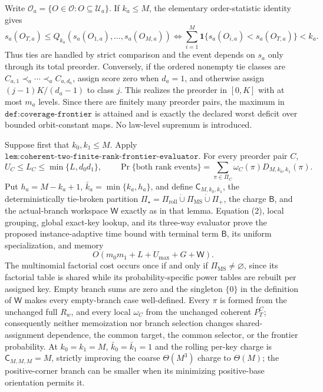 Write \(\mathcal O_a=\{O\in\mathcal O:O\subseteq\mathcal U_a\}\). If \(k_a\le M\), the elementary order-statistic identity gives
\[s_a(O_{T,a})\le Q_{k_a}(s_a(O_{1,a}),\ldots,s_a(O_{M,a}))\iff\sum_{i=1}^M\mathbf 1\{s_a(O_{i,a})<s_a(O_{T,a})\}<k_a.\tag{1}\]
Thus ties are handled by strict comparison and the event depends on \(s_a\) only through its total preorder. Conversely, if the ordered nonempty tie classes are \(C_{a,1}\prec_a\cdots\prec_a C_{a,d_a}\), assign score zero when \(d_a=1\), and otherwise assign \((j-1)K/(d_a-1)\) to class \(j\). This realizes the preorder in \([0,K]\) with at most \(m_a\) levels. Since there are finitely many preorder pairs, the maximum in \(\texttt{def:coverage-frontier}\) is attained and is exactly the declared worst deficit over bounded orbit-constant maps. No law-level supremum is introduced.

Suppose first that \(k_0,k_1\le M\). Apply \(\texttt{lem:coherent-two-finite-rank-frontier-evaluator}\). For every preorder pair \(C\),
\[U_C\le L_C\le\min\{L,d_0d_1\},\qquad \Pr\{\text{both rank events}\}=\sum_{\pi\in\Pi_C}\omega_C(\pi)D_{M,k_0,k_1}(\pi).\tag{2}\]
Put \(h_a=M-k_a+1\), \(\bar k_a=\min\{k_a,h_a\}\), and define \(\mathsf C_{M,k_0,k_1}\), the deterministically tie-broken partition \(\Pi_\star=\Pi_{\mathrm{roll}}\mathbin{\dot\cup}\Pi_{\mathrm{MS}}\mathbin{\dot\cup}\Pi_+\), the charge \(\mathsf B\), and the actual-branch workspace \(\mathsf W\) exactly as in that lemma. Equation (2), local grouping, global exact-key lookup, and its three-way evaluator prove the proposed instance-adaptive time bound with terminal term \(\mathsf B\), its uniform specialization, and memory
\[O(m_0m_1+L+U_{\max}+G+\mathsf W).\tag{3}\]
The multinomial factorial cost occurs once if and only if \(\Pi_{\mathrm{MS}}\ne\varnothing\), since its factorial table is shared while its probability-specific power tables are rebuilt per assigned key. Empty branch sums are zero and the singleton \(\{0\}\) in the definition of \(\mathsf W\) makes every empty-branch case well-defined. Every \(\pi\) is formed from the unchanged full \(R_w\), and every local \(\omega_C\) from the unchanged coherent \(P_T^C\); consequently neither memoization nor branch selection changes shared-assignment dependence, the common target, the common selector, or the frontier probability. At \(k_0=k_1=M\), \(\bar k_0=\bar k_1=1\) and the rolling per-key charge is \(\mathsf C_{M,M,M}=M\), strictly improving the coarse \(\Theta(M^3)\) charge to \(\Theta(M)\); the positive-corner branch can be smaller when its minimizing positive-base orientation permits it.

